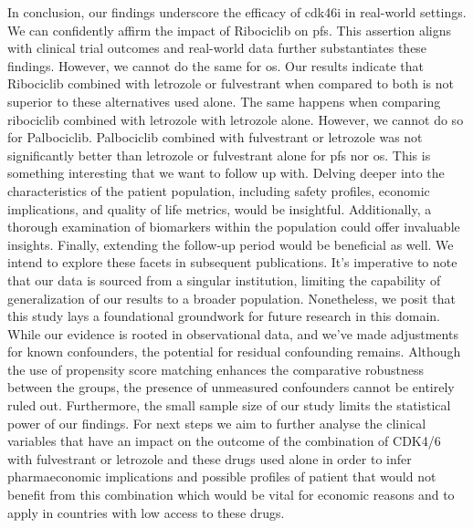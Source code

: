 In conclusion, our findings underscore the efficacy of \ac{cdk46i} in real-world settings. We can confidently affirm the impact of Ribociclib on \ac{pfs}. This assertion aligns with clinical trial outcomes and real-world data further substantiates these findings. However, we cannot do the same for \ac{os}. Our results indicate that Ribociclib combined with letrozole or fulvestrant when compared to both is not superior to these alternatives used alone. The same happens when comparing ribociclib combined with letrozole with letrozole alone. 
However, we cannot do so for Palbociclib. Palbociclib combined with fulvestrant or letrozole was not significantly better than letrozole or fulvestrant alone for \ac{pfs} nor \ac{os}. This is something interesting that we want to follow up with.
Delving deeper into the characteristics of the patient population, including safety profiles, economic implications, and quality of life metrics, would be insightful. Additionally, a thorough examination of biomarkers within the population could offer invaluable insights. Finally, extending the follow-up period would be beneficial as well. We intend to explore these facets in subsequent publications.
It’s imperative to note that our data is sourced from a singular institution, limiting the capability of generalization of our results to a broader population. Nonetheless, we posit that this study lays a foundational groundwork for future research in this domain. While our evidence is rooted in observational data, and we’ve made adjustments for known confounders, the potential for residual confounding remains. Although the use of propensity score matching enhances the comparative robustness between the groups, the presence of unmeasured confounders cannot be entirely ruled out. Furthermore, the small sample size of our study limits the statistical power of our findings. For next steps we aim to further analyse the clinical variables that have an impact on the outcome of the combination of CDK4/6 with fulvestrant or letrozole and these drugs used alone in order to infer pharmaeconomic implications and possible profiles of patient that would not benefit from this combination which would be vital for economic reasons and to apply in countries with low access to these drugs.